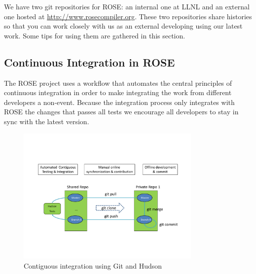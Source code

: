 We have two git repositories for ROSE: an internal one at LLNL and an external
one hosted at \url{http://www.rosecompiler.org}. These two repositories share histories so that
you can work closely with us as an external developing using our latest work. 
Some tips for using them are gathered in this section.


\subsection{Continuous Integration in ROSE}

The ROSE project uses a workflow that automates the central principles of
continuous integration in order to make integrating the work from different
developers a non-event. Because the integration process only integrates
with ROSE the changes that passes all tests we encourage all developers
to stay in sync with the latest version.

\begin{figure}[htbp]  
  \centering
    \includegraphics[width=0.8\textwidth]{rose-git-hudson.pdf}
  \caption{Contiguous integration using Git and Hudson}
  \label{fig:rose-git-hudson}
\end{figure}

